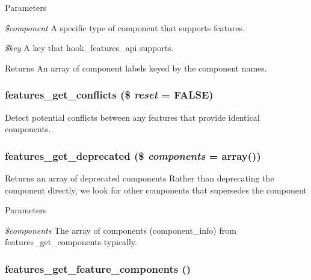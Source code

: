 \begin{DoxyParams}{Parameters}
\item[{\em \$component}]A specific type of component that supports features. \item[{\em \$key}]A key that hook\_\-features\_\-api supports.\end{DoxyParams}
\begin{DoxyReturn}{Returns}
An array of component labels keyed by the component names. 
\end{DoxyReturn}
\hypertarget{features_8module_a0e952cf77cb9bbe9a81d5997d8ce5e70}{
\subsubsection[{features\_\-get\_\-conflicts}]{\setlength{\rightskip}{0pt plus 5cm}features\_\-get\_\-conflicts (\$ {\em reset} = {\ttfamily FALSE})}}
\label{features_8module_a0e952cf77cb9bbe9a81d5997d8ce5e70}
Detect potential conflicts between any features that provide identical components. \hypertarget{features_8module_a354c070d172b313930b395af9b9de90b}{
\subsubsection[{features\_\-get\_\-deprecated}]{\setlength{\rightskip}{0pt plus 5cm}features\_\-get\_\-deprecated (\$ {\em components} = {\ttfamily array()})}}
\label{features_8module_a354c070d172b313930b395af9b9de90b}
Returns an array of deprecated components Rather than deprecating the component directly, we look for other components that supersedes the component 
\begin{DoxyParams}{Parameters}
\item[{\em \$components}]The array of components (component\_\-info) from features\_\-get\_\-components typically. \end{DoxyParams}
\hypertarget{features_8module_a714c640c4e8c11ee30eacc1510415598}{
\subsubsection[{features\_\-get\_\-feature\_\-components}]{\setlength{\rightskip}{0pt plus 5cm}features\_\-get\_\-feature\_\-components ()}}
